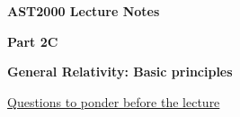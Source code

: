 



\vspace*{2cm}

{\centerline{\bf\huge AST2000 Lecture Notes}}

\vspace*{1cm}

\newcommand{\PartName}{2C}
\newcommand{\refproblem}[1]{\PartName.\ref{#1}}


{\centerline{\bf\LARGE Part \PartName}}\vspace*{0.25cm}
{\centerline{\bf\LARGE General Relativity:  Basic principles}}

\vspace*{1cm}

{\centerline{\underline{\LARGE Questions to ponder before the lecture}}}

\vspace*{1cm}

